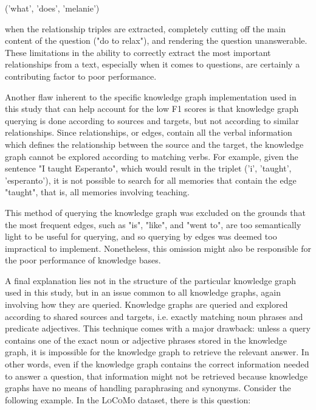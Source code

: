 \begin{displayquote}
('what', 'does', 'melanie')
\end{displayquote}

\noindent when the relationship triples are extracted, completely cutting off the main content of the question ("do to relax"), and rendering the question unanswerable. These limitations in the ability to correctly extract the most important relationships from a text, especially when it comes to questions, are certainly a contributing factor to poor performance.

Another flaw inherent to the specific knowledge graph implementation used in this study that can help account for the low F1 scores is that knowledge graph querying is done according to sources and targets, but not according to similar relationships. Since relationships, or edges, contain all the verbal information which defines the relationship between the source and the target, the knowledge graph cannot be explored according to matching verbs. For example, given the sentence "I taught Esperanto", which would result in the triplet ('i', 'taught', 'esperanto'), it is not possible to search for all memories that contain the edge "taught", that is, all memories involving teaching.

This method of querying the knowledge graph was excluded on the grounds that the most frequent edges, such as "is", "like", and "went to", are too semantically light to be useful for querying, and so querying by edges was deemed too impractical to implement. Nonetheless, this omission might also be responsible for the poor performance of knowledge bases.

A final explanation lies not in the structure of the particular knowledge graph used in this study, but in an issue common to all knowledge graphs, again involving how they are queried. Knowledge graphs are queried and explored according to shared sources and targets, i.e. exactly matching noun phrases and predicate adjectives. This technique comes with a major drawback: unless a query contains one of the exact noun or adjective phrases stored in the knowledge graph, it is impossible for the knowledge graph to retrieve the relevant answer. In other words, even if the knowledge graph contains the correct information needed to answer a question, that information might not be retrieved because knowledge graphs have no means of handling paraphrasing and synonyms. Consider the following example. In the \textsc{LoCoMo} dataset, there is this question:\\

